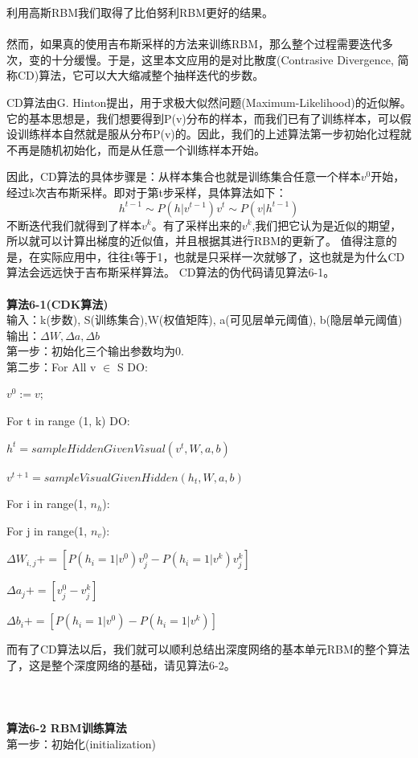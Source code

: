 	利用高斯RBM我们取得了比伯努利RBM更好的结果。
	\\
	\\
	然而，如果真的使用吉布斯采样的方法来训练RBM，那么整个过程需要迭代多次，变的十分缓慢。于是，这里本文应用的是对比散度(Contrasive Divergence, 简称CD)算法，它可以大大缩减整个抽样迭代的步数。
	
	CD算法由G. Hinton提出，用于求极大似然问题(Maximum-Likelihood)的近似解。它的基本思想是，我们想要得到P(v)分布的样本，而我们已有了训练样本，可以假设训练样本自然就是服从分布P(v)的。因此，我们的上述算法第一步初始化过程就不再是随机初始化，而是从任意一个训练样本开始。
	
	因此，CD算法的具体步骤是：从样本集合也就是训练集合任意一个样本$v^0$开始，经过k次吉布斯采样。即对于第t步采样，具体算法如下：
	\begin{equation}
	h^{t-1} \sim P(h|v^{t-1})
	v^t \sim P(v|h^{t-1})
	\end{equation}
	不断迭代我们就得到了样本$v^k$。有了采样出来的$v^k$,我们把它认为是近似的期望，所以就可以计算出梯度的近似值，并且根据其进行RBM的更新了。
	值得注意的是，在实际应用中，往往t等于1，也就是只采样一次就够了，这也就是为什么CD算法会远远快于吉布斯采样算法。
	CD算法的伪代码请见算法6-1。\\ \\
	\textbf{算法6-1(CDK算法)}\\
	输入：k(步数), S(训练集合),W(权值矩阵), a(可见层单元阈值), b(隐层单元阈值)\\
	输出：$\Delta W, \Delta a, \Delta b$\\
	第一步：初始化三个输出参数均为0.\\
	第二步：For All v $\in$ S DO:
	
		\qquad $v^0 := v;$
		
		\qquad For t in range (1, k) DO:
		
			\qquad \qquad $h^t= sampleHiddenGivenVisual (v^t, W, a, b)$
			
			\qquad \qquad $v^{t+1}= sampleVisualGivenHidden(h_t, W, a, b)$
			
		\qquad For i in range(1, $n_h$):
		
		\qquad \qquad For j in range(1, $n_v$):
		
		\qquad \qquad $\Delta W_{i, j} += [P(h_i = 1|v^0)v_j^0 - P(h_i = 1|v^k)v_j^k]$
		
		\qquad \qquad $\Delta a_j += [v_j^0 - v_j^k]$
		
		\qquad \qquad $\Delta b_i += [P(h_i = 1| v^0) - P(h_i = 1|v^k)]$
		
	而有了CD算法以后，我们就可以顺利总结出深度网络的基本单元RBM的整个算法了，这是整个深度网络的基础，请见算法6-2。\\ \\ \\ \\ 
	\textbf{算法6-2 RBM训练算法}\\
	第一步：初始化(initialization)
	
